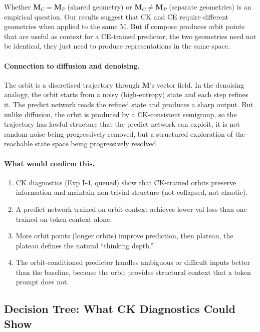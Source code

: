 \documentclass[11pt, a4paper]{article}
\newcommand{\M}{\mathbf{M}}
\theoremstyle{plain}
\theoremstyle{definition}
\theoremstyle{remark}
\begin{document}
Whether $\M_C = \M_P$ (shared geometry) or $\M_C \neq \M_P$ (separate geometries) is an empirical question.
Our results suggest that CK and CE require different geometries when applied to the same M.
But if compose produces orbit points that are useful as context for a CE-trained predictor, the two geometries need not be identical, they just need to produce representations in the same space.

\paragraph{Connection to diffusion and denoising.}
The orbit is a discretised trajectory through $\M$'s vector field.
In the denoising analogy, the orbit starts from a noisy (high-entropy) state and each step refines it.
The predict network reads the refined state and produces a sharp output.
But unlike diffusion, the orbit is produced by a CK-consistent semigroup, so the trajectory has lawful structure that the predict network can exploit, it is not random noise being progressively removed, but a structured exploration of the reachable state space being progressively resolved.

\paragraph{What would confirm this.}
\begin{enumerate}[nosep]
    \item CK diagnostics (Exp I-4, queued) show that CK-trained orbits preserve information and maintain non-trivial structure (not collapsed, not chaotic).
    \item A predict network trained on orbit context achieves lower val loss than one trained on token context alone.
    \item More orbit points (longer orbits) improve prediction, then plateau, the plateau defines the natural ``thinking depth.''
    \item The orbit-conditioned predictor handles ambiguous or difficult inputs better than the baseline, because the orbit provides structural context that a token prompt does not.
\end{enumerate}

\subsection{Decision Tree: What CK Diagnostics Could Show}\label{sec:ck-decision-tree}
\end{document}
